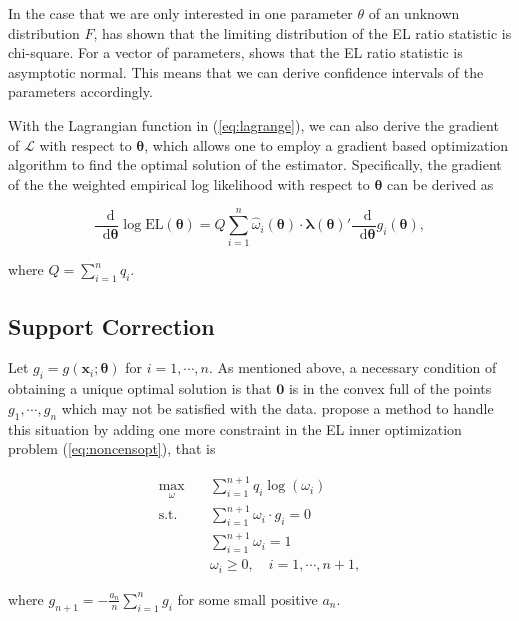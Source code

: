 \documentclass[article]{jss}
\newcommand{\xx}{\bm x}
\newcommand{\tth}{\bm \theta}
\newcommand{\lla}{\bm \lambda}
\newcommand{\w}{\omega}
\renewcommand{\L}{\mathcal{L}}
\newcommand{\EL}{\textrm{EL}}
\renewcommand{\|}{\,|\,}
\newcommand{\ud}{\mathop{}\!\mathrm{d}}
\newcommand{\dth}{\frac{\ud}{\ud\tth}}
\begin{document}
In the case that we are only interested in one parameter \(\theta\) of an unknown distribution \(F\), \citet{owen1990} has shown that the limiting distribution of the EL ratio statistic is chi-square. For a vector of parameters, \citet{qin-lawless1994} shows that the EL ratio statistic is asymptotic normal. This means that we can derive confidence intervals of the parameters accordingly.

With the Lagrangian function in (\ref{eq:lagrange}), we can also derive the gradient of \(\L\) with respect to \(\tth\), which allows one to employ a gradient based optimization algorithm to find the optimal solution of the estimator. Specifically, the gradient of the the weighted empirical log likelihood with respect to \(\tth\) can be derived as

\begin{equation}
\dth \log \EL(\tth) = Q \sum_{i=1}^n \hat \omega_i(\tth) \cdot \lla(\tth)' \dth g_i(\tth),
\end{equation}

where \(Q = \sum_{i=1}^n q_i\).

\hypertarget{support-correction}{%
\subsection{Support Correction}\label{support-correction}}

Let \(g_i = g(\xx_i;\tth)\) for \(i = 1,\cdots, n\). As mentioned above, a necessary condition of obtaining a unique optimal solution is that \(\bm 0\) is in the convex full of the points \(g_1,\cdots,g_n\) which may not be satisfied with the data. \citet{chen-et-al2008} propose a method to handle this situation by adding one more constraint in the EL inner optimization problem (\ref{eq:noncensopt}), that is

\begin{equation} \label{eq:noncensoptadj}
\begin{split}
  \max_{\w}\quad & \sum_{i=1}^{n+1} q_i \log(\w_i) \\
  \text{s.t.}\quad & \sum_{i=1}^{n+1} \w_i\cdot g_i = 0 \\
  & \sum_{i=1}^{n+1} \w_i = 1 \\
  & \w_i \geq 0, \quad i=1,\cdots,{n+1},
\end{split}
\end{equation}

where \(g_{n+1} = -\frac{a_n}{n} \sum_{i=1}^n g_i\) for some small positive \(a_n\).
\end{document}
